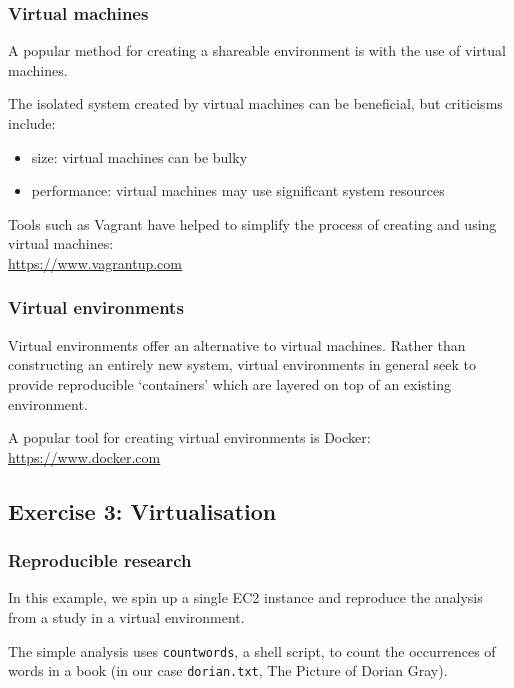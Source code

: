 \subsubsection{Virtual machines}\label{virtual-machines}

A popular method for creating a shareable environment is with the use of
virtual machines.

The isolated system created by virtual machines can be beneficial, but
criticisms include:

\begin{itemize}
\itemsep1pt\parskip0pt
\item
  size: virtual machines can be bulky
\item
  performance: virtual machines may use significant system resources
\end{itemize}

Tools such as Vagrant have helped to simplify the process of creating
and using virtual
machines:\\\href{https://www.vagrantup.com/}{https://www.vagrantup.com}

\subsubsection{Virtual environments}\label{virtual-environments}

Virtual environments offer an alternative to virtual machines. Rather
than constructing an entirely new system, virtual environments in
general seek to provide reproducible `containers' which are layered on
top of an existing environment.

A popular tool for creating virtual environments is
Docker:\\\href{https://www.docker.com/}{https://www.docker.com}

\subsection{Exercise 3: Virtualisation}\label{exercise-3-virtualisation}

\subsubsection{Reproducible research}\label{reproducible-research-1}

In this example, we spin up a single EC2 instance and reproduce the
analysis from a study in a virtual environment.

The simple analysis uses \texttt{countwords}, a shell script, to count
the occurrences of words in a book (in our case \texttt{dorian.txt}, The
Picture of Dorian Gray).

